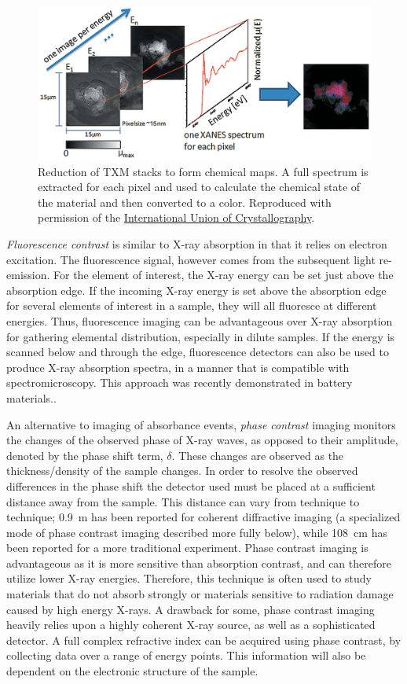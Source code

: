 \documentclass[journal=cmatex,manuscript=perspective]{achemso}
\newcommand{\iucr}{Reproduced with permission of the
  \href{http://journals.iucr.org/}{International Union of
    Crystallography}.}
\begin{document}
\begin{figure}
  \includegraphics[width=\textwidth]{meirer2011-2.png}
  \caption{Reduction of TXM stacks to form chemical maps. A full
    spectrum is extracted for each pixel and used to calculate the
    chemical state of the material and then converted to a
    color.\cite{meirer2011} \iucr}
  \label{figure:meirer2011-2}
\end{figure}

\emph{Fluorescence contrast} is similar to X-ray absorption in that it relies
on electron excitation. The fluorescence signal, however comes from
the subsequent light re-emission. For the element of interest, the
X-ray energy can be set just above the absorption edge. If the
incoming X-ray energy is set above the absorption edge for several
elements of interest in a sample, they will all fluoresce at different
energies. Thus, fluorescence imaging can be advantageous over X-ray
absorption for gathering elemental distribution, especially in dilute
samples. If the energy is scanned below and through the edge,
fluorescence detectors can also be used to produce X-ray absorption
spectra, in a manner that is compatible with spectromicroscopy. This
approach was recently demonstrated in battery
materials.\cite{chueh2015}.

An alternative to imaging of absorbance events, \emph{phase contrast}
imaging monitors the changes of the observed phase of X-ray waves, as
opposed to their amplitude, denoted by the phase shift term,
$\delta$. These changes are observed as the thickness/density of the
sample changes. In order to resolve the observed differences in the
phase shift the detector used must be placed at a sufficient distance
away from the sample. This distance can vary from technique to
technique; \SI{0.9}{m} has been reported for coherent diffractive
imaging (a specialized mode of phase contrast imaging described more
fully below)\cite{shpyrko2014}, while \SI{108}{cm} has been reported
for a more traditional experiment\cite{wen2014}. Phase contrast
imaging is advantageous as it is more sensitive than absorption
contrast, and can therefore utilize lower X-ray energies. Therefore,
this technique is often used to study materials that do not absorb
strongly or materials sensitive to radiation damage caused by high
energy X-rays. A drawback for some, phase contrast imaging heavily
relies upon a highly coherent X-ray source, as well as a sophisticated
detector. A full complex refractive index can be acquired using phase
contrast, by collecting data over a range of energy points. This
information will also be dependent on the electronic structure of the
sample.
\end{document}
